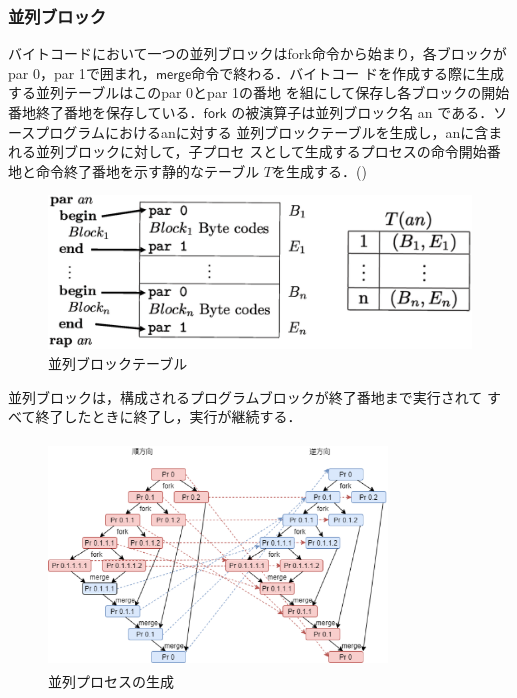 \documentclass[submit,PRO]{ipsj}
\newcommand{\bcode}[1]{$\mathsf{#1}$}
\begin{document}
\subsubsection{並列ブロック}

バイトコードにおいて一つの並列ブロックはfork命令から始まり，各ブロックが
{\sf par 0}，{\sf par 1}で囲まれ，\bcode{merge}命令で終わる．バイトコー
ドを作成する際に生成する並列テーブルはこの{\sf par 0}と{\sf par 1}の番地
を組にして保存し各ブロックの開始番地終了番地を保存している．\bcode{fork}
の被演算子は並列ブロック名 an である．ソースプログラムにおけるanに対する
並列ブロックテーブルを生成し，anに含まれる並列ブロックに対して，子プロセ
スとして生成するプロセスの命令開始番地と命令終了番地を示す静的なテーブル
$T$を生成する．()

\begin{figure}[tb]
\includegraphics[width=.8\linewidth]{./parallelTable_1.eps}
\caption{並列ブロックテーブル}
\label{fig:parallelTable}
\end{figure}

並列ブロックは，構成されるプログラムブロックが終了番地まで実行されて
すべて終了したときに終了し，実行が継続する．

\begin{figure}[tb]
\includegraphics[height=6.0cm,width=9.0cm]{./parallel.eps}
\caption{並列プロセスの生成}
\label{fig:parallel}
\end{figure}
\end{document}
